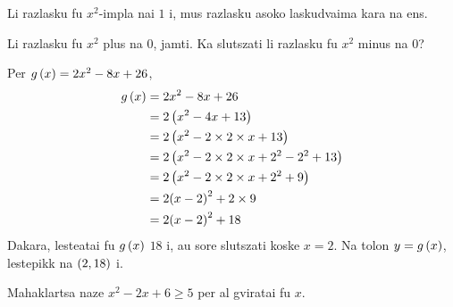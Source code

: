 Li razlasku fu \(x^2\)-impla nai \(1\) i, mus  razlasku
asoko laskudvaima kara na ens.

\begin{remark}
	Li razlasku fu \(x^2\) plus na \(0\),  jamti. Ka slutszati
	li razlasku fu \(x^2\) minus na \(0\)?
\end{remark}

\begin{example}
	Per \(g\left(x\right) = 2x^2 - 8x + 26\),
	\begin{align*}
		g\left(x\right) & = 2x^2 - 8x + 26                                   \\
		        & = 2\left(x^2 - 4x + 13\right)                              \\
		        & = 2\left(x^2 - 2 \times 2 \times x + 13\right)             \\
		        & = 2\left(x^2 - 2 \times 2 \times x + 2^2 - 2^2 + 13\right) \\
		        & = 2\left(x^2 - 2 \times 2 \times x + 2^2 + 9\right)        \\
		        & = 2{\left(x - 2\right)}^2 + 2 \times 9                     \\
		        & = 2{\left(x - 2\right)}^2 + 18                             \\
	\end{align*}
	Dakara, lesteatai fu \(g\left(x\right)\) \(18\) i, au sore slutszati koske
	\(x = 2\). Na tolon \(y = g\left(x\right)\), lestepikk na \(\left(2, 18\right)\) i.
\end{example}

\begin{problem}
Mahaklartsa naze \(x^2 - 2x + 6 \geq 5\)
per al gviratai fu \(x\).
\end{problem}

